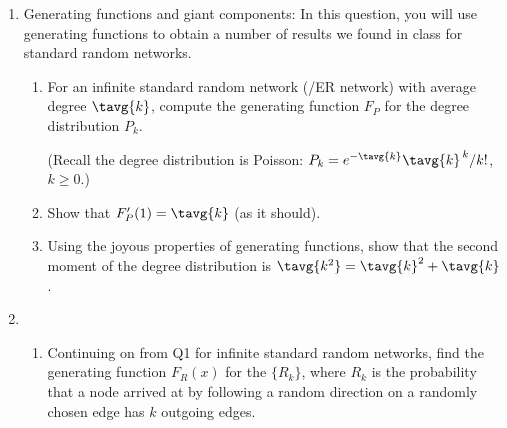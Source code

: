 \begin{enumerate}

   \solutionend



     \item 
       Generating functions and giant components:  In 
       this question, you will use generating functions to obtain
       a number of results we found in class for standard
       random networks.

       \begin{enumerate}
       \item 
         For an infinite standard random network 
         (\erdosrenyi/ER network)
         with average degree $\tavg{k}$,
         compute the generating function $F_{P}$ for the degree distribution $P_{k}$.

         (Recall the degree distribution is Poisson: 
         $P_{k} = e^{-{\tavg{k}}} {\tavg{k}}^{\, k} / k!$, $k \ge 0$.)

         
   \solutionstart


   \solutionend

       \item
         Show that $F_{P}'(1) = {\tavg{k}}$ (as it should).

         
   \solutionstart


   \solutionend

       \item
         Using the joyous properties of 
         generating functions, show that
         the second moment of the degree distribution
         is $\tavg{k^{2}}={\tavg{k}}^{2}+{\tavg{k}}$.

         
   \solutionstart


   \solutionend

       \end{enumerate}


     \item 
       \begin{enumerate}
       \item
         Continuing on from Q1 for infinite standard
         random networks, find the generating function $F_{R}(x)$ for the $\{R_{k}\}$, 
         where $R_{k}$ is the probability
         that a node arrived at by following a random direction
         on a randomly chosen edge has $k$ outgoing edges.


\end{enumerate}
\end{enumerate}
